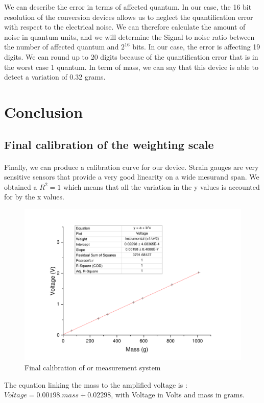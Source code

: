 \documentclass{article}[12pt]
\begin{document}
We can describe the error in terms of affected quantum. In our case, the 16 bit resolution of the conversion devices allows us to neglect the quantification error with respect to the electrical noise. We can therefore calculate the amount of noise in quantum units, and we will determine the Signal to noise ratio between the number of affected quantum and $2^{16}$ bits. In our case, the error is affecting 19 digits. We can round up to 20 digits because of the quantification error that is in the worst case 1 quantum. In term of mass, we can say that this device is able to detect a variation of 0.32 grams.
\section{Conclusion}
\subsection{Final calibration of the weighting scale}
\paragraph{}
Finally, we can produce a calibration curve for our device. Strain gauges are very sensitive sensors that provide a very good linearity on a wide mesurand span. We obtained a $R^2=1$ which means that all the variation in the y values is accounted for by the x values. 
\begin{figure}[H]
    \centering
    \includegraphics[width=.8\textwidth]{figures/calibr.pdf}
    \caption{Final calibration of or measurement system}
    \label{fig:final_calibration}
\end{figure}
The equation linking the mass to the amplified voltage is : $Voltage = 0.00198.mass+0.02298$, with Voltage in Volts and mass in grams.
\end{document}
